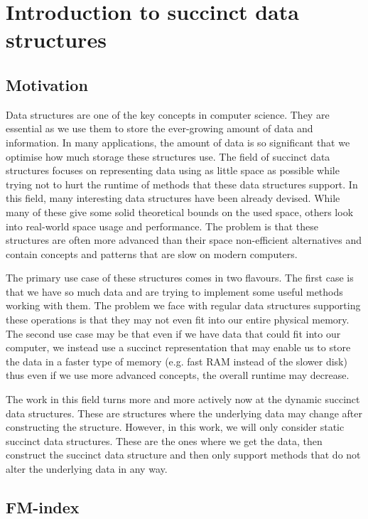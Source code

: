 \chapter{Introduction to succinct data structures}
\label{kap:kap1}

\section{Motivation}
Data structures are one of the key concepts in computer science. They are essential
as we use them to store the ever-growing amount of data and information. In many
applications, the amount of data is so significant that we optimise how much storage
these structures use. The field of succinct data structures focuses on representing
data using as little space as possible while trying not to hurt the runtime of methods
that these data structures support. In this field, many interesting data structures
have been already devised. While many of these give some solid theoretical bounds on
the used space, others look into real-world space usage and performance. The problem
is that these structures are often more advanced than their space non-efficient alternatives
and contain concepts and patterns that are slow on modern computers.

The primary use case of these structures comes in two flavours. The first case is
that we have so much data and are trying to implement some useful methods working
with them. The problem we face with regular data structures supporting these
operations is that they may not even fit into our entire physical memory. The
second use case may be that even if we have data that could fit into our computer,
we instead use a succinct representation that may enable us to store the data in
a faster type of memory (e.g. fast RAM instead of the slower disk) thus even if we
use more advanced concepts, the overall runtime may decrease.

The work in this field turns more and more actively now at the dynamic succinct
data structures. These are structures where the underlying data may change after
constructing the structure. However, in this work, we will only consider static
succinct data structures. These are the ones where we get the data, then construct
the succinct data structure and then only support methods that do not alter the
underlying data in any way.  

\section{FM-index}

